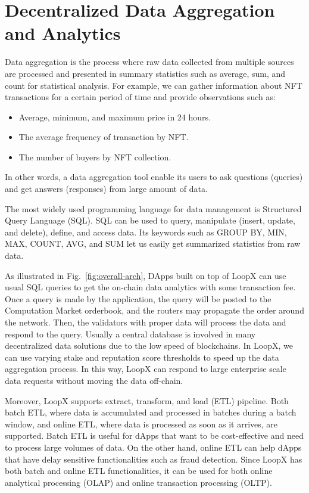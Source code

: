 \documentclass[11pt,letterpaper]{article}
\begin{document}
\section{Decentralized Data Aggregation and Analytics}

Data aggregation is the process where raw data collected from multiple sources are processed and presented in summary statistics such as average, sum, and count for statistical analysis. For example, we can gather information about NFT transactions for a certain period of time and provide observations such as:
\begin{itemize}
    \item Average, minimum, and maximum price in 24 hours.
    \item The average frequency of transaction by NFT.
    \item The number of buyers by NFT collection.
\end{itemize}
In other words, a data aggregation tool enable its users to ask questions (queries) and get answers (responses) from large amount of data. 

The most widely used programming language for data management is Structured Query Language (SQL). SQL can be used to query, manipulate (insert, update, and delete), define, and access data. Its keywords such as GROUP BY, MIN, MAX, COUNT, AVG, and SUM let us easily get summarized statistics from raw data.

As illustrated in Fig.~\ref{fig:overall-arch}, DApps built on top of LoopX can use usual SQL queries to get the on-chain data analytics with some transaction fee. Once a query is made by the application, the query will be posted to the Computation Market orderbook, and the routers may propagate the order around the network. Then, the validators with proper data will process the data and respond to the query. Usually a central database is involved in many decentralized data solutions due to the low speed of blockchains. In LoopX, we can use varying stake and reputation score thresholds to speed up the data aggregation process. In this way, LoopX can respond to large enterprise scale data requests without moving the data off-chain.

Moreover, LoopX supports extract, transform, and load (ETL) pipeline.  Both batch ETL, where data is accumulated and processed in batches during a batch window, and online ETL, where data is processed as soon as it arrives, are supported. Batch ETL is useful for dApps that want to be cost-effective and need to process large volumes of data. On the other hand, online ETL can help dApps that have delay sensitive functionalities such as fraud detection. Since LoopX has both batch and online ETL functionalities, it can be used for both online analytical processing (OLAP) and online transaction processing (OLTP).
\end{document}
